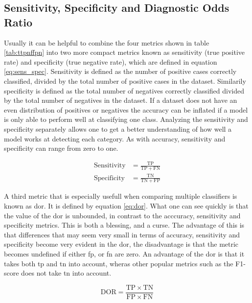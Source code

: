 \subsection{Sensitivity, Specificity and Diagnostic Odds Ratio}
Usually it can be helpful to combine the four metrics shown in table \ref{tab:ttpnffpn} into two more compact metrics known as sensitivity (true positive rate) and specificity (true negative rate), which are defined in equation \eqref{eq:sens_spec}. Sensitivity is defined as the number of positive cases correctly classified, divided by the total number of positive cases in the dataset. Similarily specificity is defined as the total number of negatives correctly classified divided by the total number of negatives in the dataset. If a dataset does not have an even distribution of positives or negatives the accuracy can be inflated if a model is only able to perform well at classifying one class. Analyzing the sensitivity and specificity separately allows one to get a better understanding of how well a model works at detecting each category. As with accuracy, sensitivity and specificity can range from zero to one.

\begin{equation}
    \begin{split}
        \mathrm{Sensitivity} &= \frac{\mathrm{TP}}{\mathrm{TP} + \mathrm{FN}} \\
        \mathrm{Specificity} &= \frac{\mathrm{TN}}{\mathrm{TN} + \mathrm{FP}}
    \end{split}
    \label{eq:sens_spec}
\end{equation}

A third metric that is especially usefull when comparing multiple classifiers is known as \acrfull{dor}. It is defined by equation \eqref{eq:dor}. What one can see quickly is that the value of the \acrshort{dor} is unbounded, in contrast to the acccuracy, sensitivity and specificity metrics. This is both a blessing, and a curse. The advantage of this is that differences that may seem very small in terms of accuracy, sensitivity and specificity become very evident in the \acrshort{dor}, the disadvantage is that the metric becomes undefined if either \acrshort{fp}, or \acrshort{fn} are zero. An advantage of the \acrshort{dor} is that it takes both \acrshort{tp} and \acrshort{tn} into account, wheras other popular metrics such as the F1-score does not take \acrshort{tn} into account. 

\begin{equation}
    \mathrm{DOR} = \frac{\mathrm{TP}\times\mathrm{TN}}{\mathrm{FP}\times\mathrm{FN}}
    \label{eq:dor}
\end{equation}

